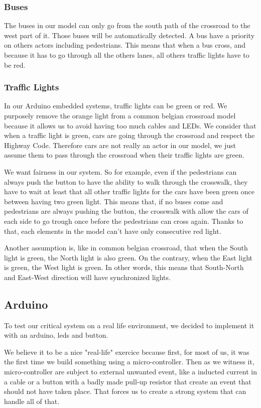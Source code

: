 \subsubsection{Buses}
The buses in our model can only go from the south path of the crossroad to the west part of it. Those buses will be automatically detected. A bus have a priority on others actors including pedestrians. This means that when a bus cross, and because it has to go through all the others lanes, all others traffic lights have to be red.

\subsubsection{Traffic Lights}
In our Arduino embedded systems, traffic lights can be green or red. We purposely remove the orange light from a common belgian crossroad model because it allows us to avoid having too much cables and LEDs. We consider that when a traffic light is green, cars are going through the crossroad and respect the Highway Code. Therefore cars are not really an actor in our model, we just assume them to pass through the crossroad when their traffic lights are green. 

We want fairness in our system. So for example, even if the pedestrians can always push the button to have the ability to walk through the crosswalk, they have to wait at least that all other traffic lights for the cars have been green once between having two green light. This means that, if no buses come and pedestrians are always pushing the button, the crosswalk with allow the cars of each side to go trough once before the pedestrians can cross again. Thanks to that, each elements in the model can't have only consecutive red light.

Another assumption is, like in common belgian crossroad, that when the South light is green, the North light is also green. On the contrary, when the East light is green, the West light is green. In other words, this means that South-North and East-West direction will have synchronized lights.


\subsection{Arduino}

To test our critical system on a real life environment, we decided to implement it with an arduino, leds and button.

We believe it to be a nice "real-life" exercice because first, for most of us, it was the first time we build something using a micro-controller. Then as we witness it, micro-controller are subject to external unwanted event, like a inducted current in a cable or a button with a badly made pull-up resistor that create an event that should not have taken place. That forces us to create a strong system that can handle all of that.
